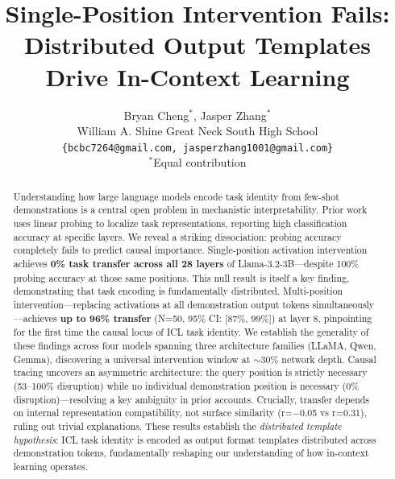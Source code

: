 \documentclass{article}
\begin{document}
\title{Single-Position Intervention Fails: \\
Distributed Output Templates Drive In-Context Learning}

\author{Bryan Cheng$^{*}$, Jasper Zhang$^{*}$ \\
William A. Shine Great Neck South High School \\
\texttt{\{bcbc7264@gmail.com, jasperzhang1001@gmail.com\}} \\
$^{*}$Equal contribution
}

\maketitle


\begin{abstract}
Understanding how large language models encode task identity from few-shot demonstrations is a central open problem in mechanistic interpretability. Prior work uses linear probing to localize task representations, reporting high classification accuracy at specific layers. We reveal a striking dissociation: probing accuracy completely fails to predict causal importance. Single-position activation intervention achieves \textbf{0\% task transfer across all 28 layers} of Llama-3.2-3B---despite 100\% probing accuracy at those same positions. This null result is itself a key finding, demonstrating that task encoding is fundamentally distributed. Multi-position intervention---replacing activations at all demonstration output tokens simultaneously---achieves \textbf{up to 96\% transfer} (N=50, 95\% CI: [87\%, 99\%]) at layer 8, pinpointing for the first time the causal locus of ICL task identity. We establish the generality of these findings across four models spanning three architecture families (LLaMA, Qwen, Gemma), discovering a universal intervention window at $\sim$30\% network depth. Causal tracing uncovers an asymmetric architecture: the query position is strictly necessary (53--100\% disruption) while no individual demonstration position is necessary (0\% disruption)---resolving a key ambiguity in prior accounts. Crucially, transfer depends on internal representation compatibility, not surface similarity (r=$-$0.05 vs r=0.31), ruling out trivial explanations. These results establish the \emph{distributed template hypothesis}: ICL task identity is encoded as output format templates distributed across demonstration tokens, fundamentally reshaping our understanding of how in-context learning operates.
\end{abstract}
\end{document}

